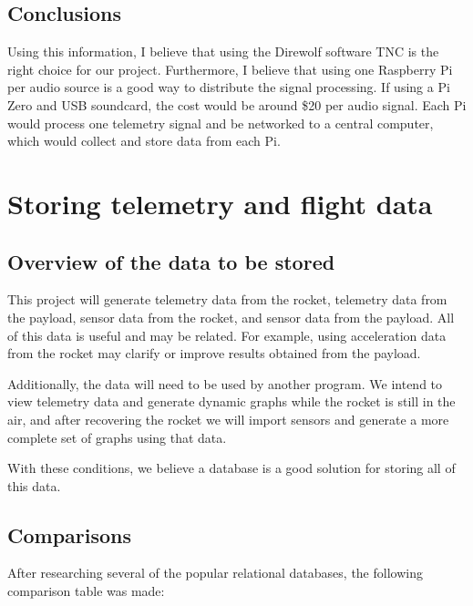 \documentclass[onecolumn, draftclsnofoot, 10pt, compsoc]{IEEEtran}
\begin{document}
\subsection{Conclusions}
Using this information, I believe that using the Direwolf software TNC is the right choice for our project. Furthermore, I believe that using one Raspberry Pi per audio source is a good way to distribute the signal processing.  If using a Pi Zero and USB soundcard, the cost would be around \$20 per audio signal.  Each Pi would process one telemetry signal and be networked to a central computer, which would collect and store data from each Pi.

\section{Storing telemetry and flight data}

\subsection{Overview of the data to be stored}
This project will generate telemetry data from the rocket, telemetry data from the payload, sensor data from the rocket, and sensor data from the payload.  All of this data is useful and may be related.  For example, using acceleration data from the rocket may clarify or improve results obtained from the payload.

Additionally, the data will need to be used by another program.  We intend to view telemetry data and generate dynamic graphs while the rocket is still in the air, and after recovering the rocket we will import sensors and generate a more complete set of graphs using that data.

With these conditions, we believe a database is a good solution for storing all of this data.

\subsection{Comparisons}
After researching several of the popular relational databases, the following comparison table was made\cite{5}\cite{6}\cite{7}:
\end{document}
